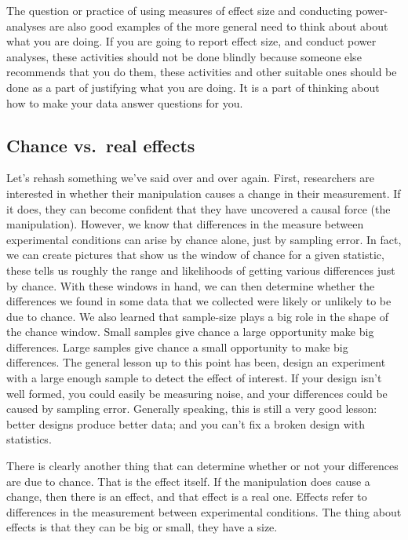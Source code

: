 \documentclass[
]{book}
\begin{document}
The question or practice of using measures of effect size and conducting power-analyses are also good examples of the more general need to think about about what you are doing. If you are going to report effect size, and conduct power analyses, these activities should not be done blindly because someone else recommends that you do them, these activities and other suitable ones should be done as a part of justifying what you are doing. It is a part of thinking about how to make your data answer questions for you.

\hypertarget{chance-vs.-real-effects}{%
\subsection{Chance vs.~real effects}\label{chance-vs.-real-effects}}

Let's rehash something we've said over and over again. First, researchers are interested in whether their manipulation causes a change in their measurement. If it does, they can become confident that they have uncovered a causal force (the manipulation). However, we know that differences in the measure between experimental conditions can arise by chance alone, just by sampling error. In fact, we can create pictures that show us the window of chance for a given statistic, these tells us roughly the range and likelihoods of getting various differences just by chance. With these windows in hand, we can then determine whether the differences we found in some data that we collected were likely or unlikely to be due to chance. We also learned that sample-size plays a big role in the shape of the chance window. Small samples give chance a large opportunity make big differences. Large samples give chance a small opportunity to make big differences. The general lesson up to this point has been, design an experiment with a large enough sample to detect the effect of interest. If your design isn't well formed, you could easily be measuring noise, and your differences could be caused by sampling error. Generally speaking, this is still a very good lesson: better designs produce better data; and you can't fix a broken design with statistics.

There is clearly another thing that can determine whether or not your differences are due to chance. That is the effect itself. If the manipulation does cause a change, then there is an effect, and that effect is a real one. Effects refer to differences in the measurement between experimental conditions. The thing about effects is that they can be big or small, they have a size.
\end{document}
